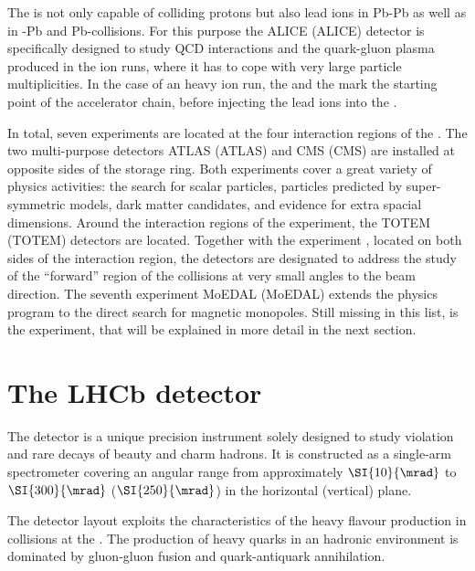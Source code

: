 The \LHC is not only capable of colliding protons but also lead ions in Pb-Pb as
well as in \proton-Pb and Pb-\proton collisions. For this purpose the
\acs{ALICE} (\acl{ALICE}) detector \cite{Aamodt:2008zz} is specifically designed
to study QCD interactions and the quark-gluon plasma produced in the \LHC ion
runs, where it has to cope with very large particle multiplicities. In the case
of an heavy ion run, the
\LINACThree and the \LEIR mark the starting point of the accelerator chain,
before injecting the lead ions into the \PSyn.

In total, seven experiments are located at the four interaction regions of the
\LHC. The two multi-purpose detectors \acs{ATLAS} (\acl{ATLAS})
\cite{Aad:2008zzm} and \acs{CMS} (\acl{CMS}) \cite{Chatrchyan:2008aa} are
installed at opposite sides of the storage ring. Both experiments cover a great
variety of physics activities: the search for scalar particles, particles
predicted by super-symmetric models, dark matter candidates, and evidence for
extra spacial dimensions. Around the interaction regions of the \CMS experiment,
the \acs{TOTEM} (\acl{TOTEM}) detectors \cite{Anelli:2008zza} are located.
Together with the \LHCf experiment \cite{Adriani:2008zz}, located on both sides
of the \ATLAS interaction region, the detectors are designated to address the
study of the \enquote{forward} region of the collisions at very small angles to
the beam direction. The seventh experiment \acs{MoEDAL} (\acl{MoEDAL}) extends
the \LHC physics program to the direct search for magnetic monopoles. Still
missing in this list, is the \LHCb experiment, that will be explained in more
detail in the next section.


\section{The LHCb detector}
\label{sec:lhcb_experiment:detector}

The \LHCb detector is a unique precision instrument solely designed to study \CP
violation and rare decays of beauty and charm hadrons. It is constructed as a
single-arm spectrometer covering an angular range from approximately
$\SI{10}{\mrad}$ to $\SI{300}{\mrad}$ ($\SI{250}{\mrad}$) in the
horizontal (vertical) plane.

The detector layout exploits the characteristics of the heavy flavour production
in \protonproton collisions at the \LHC. The production of heavy quarks in an
hadronic environment is dominated by gluon-gluon fusion and quark-antiquark
annihilation.

